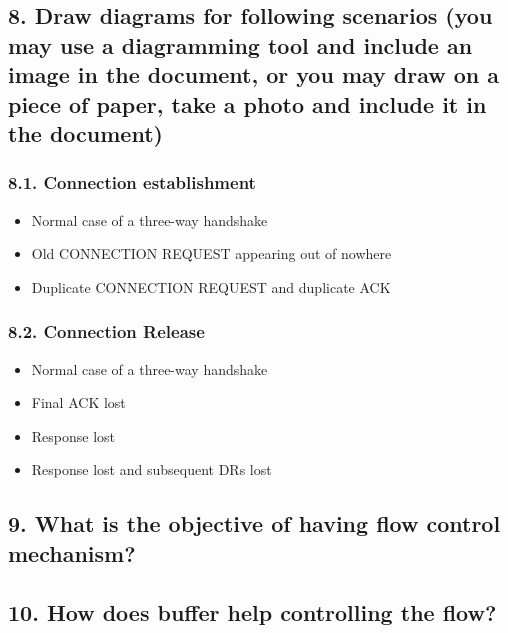 \documentclass[a4paper,11pt]{article}
\begin{document}
\subsection*{8. Draw diagrams for following scenarios (you may use a diagramming tool and include an image in the document, or you may draw on a piece of paper, take a photo and include it in the document)}

\subsubsection*{8.1. Connection establishment}

\begin{itemize}
\item Normal case of a three-way handshake
\item Old CONNECTION REQUEST appearing out of nowhere
\item Duplicate CONNECTION REQUEST  and duplicate ACK
\end{itemize}

\subsubsection*{8.2. Connection Release}

\begin{itemize}
\item Normal case of a three-way handshake
\item Final ACK lost
\item Response lost
\item Response lost and subsequent DRs lost
\end{itemize}

\subsection*{9. What is the objective of having flow control mechanism?}

\subsection*{10. How does buffer help controlling the flow?}
\end{document}
